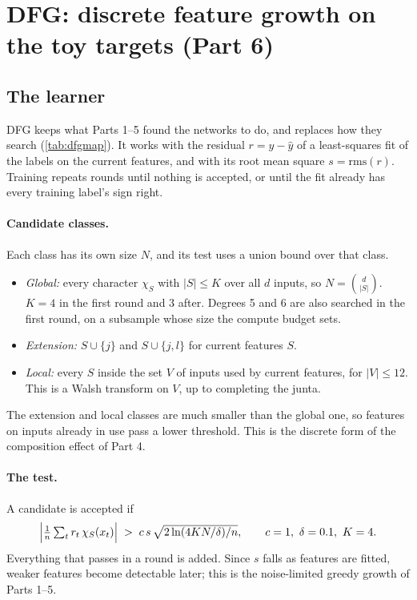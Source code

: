 \section{DFG: discrete feature growth on the toy targets (Part 6)}\label{sec:dfg}

\subsection{The learner}\label{sec:dfgalg}

DFG keeps what Parts 1--5 found the networks to do, and replaces how they search (\cref{tab:dfgmap}). It works with the residual $r=y-\hat y$ of a least-squares fit of the labels on the current features, and with its root mean square $s=\mathrm{rms}(r)$. Training repeats rounds until nothing is accepted, or until the fit already has every training label's sign right.

\paragraph{Candidate classes.} Each class has its own size $N$, and its test uses a union bound over that class.
\begin{itemize}
\item \emph{Global:} every character $\chi_S$ with $|S|\le K$ over all $d$ inputs, so $N=\binom{d}{|S|}$. $K=4$ in the first round and 3 after. Degrees 5 and 6 are also searched in the first round, on a subsample whose size the compute budget sets.
\item \emph{Extension:} $S\cup\{j\}$ and $S\cup\{j,l\}$ for current features $S$.
\item \emph{Local:} every $S$ inside the set $V$ of inputs used by current features, for $|V|\le12$. This is a Walsh transform on $V$, up to completing the junta.
\end{itemize}
The extension and local classes are much smaller than the global one, so features on inputs already in use pass a lower threshold. This is the discrete form of the composition effect of Part 4.

\paragraph{The test.} A candidate is accepted if
\begin{equation}\label{eq:dfgtest}
\Bigl|\tfrac1n\textstyle\sum_{t} r_t\,\chi_S(x_t)\Bigr|\;>\;c\,s\,\sqrt{2\ln(4KN/\delta)/n},\qquad c=1,\ \delta=0.1,\ K=4.
\end{equation}
Everything that passes in a round is added. Since $s$ falls as features are fitted, weaker features become detectable later; this is the noise-limited greedy growth of Parts 1--5.

